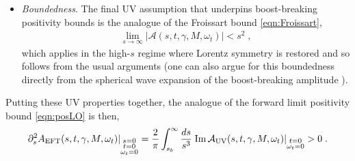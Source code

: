 \documentclass[11pt]{article}
\begin{document}
\begin{itemize}
\item \emph{Boundedness}.
The final UV assumption that underpins boost-breaking positivity bounds is the analogue of the Froissart bound \eqref{eqn:Froissart}, 
\begin{align}
 \lim_{s\to \infty}  | \mathcal{A} (s,t, \gamma, M , \omega_t )   | < s^2  \; , 
\end{align}
which applies in the high-$s$ regime where Lorentz symmetry is restored and so follows from the usual arguments (one can also argue for this boundedness directly from the spherical wave expansion of the boost-breaking amplitude \cite{Grall:2021xxm}). 

\end{itemize}
Putting these UV properties together, the analogue of the forward limit positivity bound \eqref{eqn:posLO} is then,
\begin{align}
 \partial_s^2 A_{\rm EFT} ( s, t , \gamma,  M , \omega_t ) |_{\substack{ s = 0\\ t=0 \\ \omega_t = 0 } } = \frac{2}{\pi}  \int_{s_b}^{\infty} \frac{ds}{s^3}  \; \text{Im} \, \mathcal{A}_{\rm UV} (s, t, \gamma, M , \omega_t ) |_{ \substack{t=0 \\ \omega_t = 0} }  > 0  \; .
 \label{eqn:posLO2}
\end{align}
\end{document}
